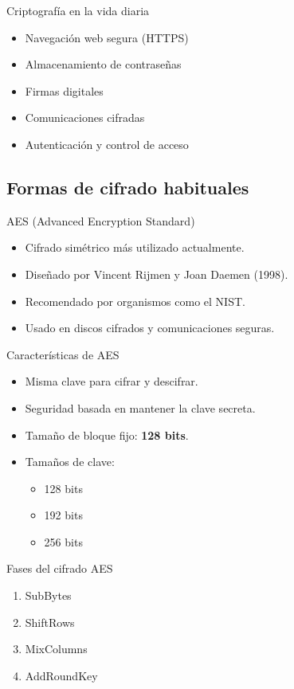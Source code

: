 \documentclass{beamer}
\begin{document}
\begin{frame}{Criptografía en la vida diaria}
\begin{itemize}
  \item Navegación web segura (HTTPS)
  \item Almacenamiento de contraseñas
  \item Firmas digitales
  \item Comunicaciones cifradas
  \item Autenticación y control de acceso
\end{itemize}
\end{frame}

\subsection{Formas de cifrado habituales}

\begin{frame}{AES (Advanced Encryption Standard)}
\begin{itemize}
  \item Cifrado simétrico más utilizado actualmente.
  \item Diseñado por Vincent Rijmen y Joan Daemen (1998).
  \item Recomendado por organismos como el NIST.
  \item Usado en discos cifrados y comunicaciones seguras.
\end{itemize}
\end{frame}

\begin{frame}{Características de AES}
\begin{itemize}
  \item Misma clave para cifrar y descifrar.
  \item Seguridad basada en mantener la clave secreta.
  \item Tamaño de bloque fijo: \textbf{128 bits}.
  \item Tamaños de clave:
  \begin{itemize}
    \item 128 bits
    \item 192 bits
    \item 256 bits
  \end{itemize}
\end{itemize}
\end{frame}

\begin{frame}{Fases del cifrado AES}
\begin{enumerate}
  \item SubBytes
  \item ShiftRows
  \item MixColumns
  \item AddRoundKey
\end{enumerate}
\end{frame}
\end{document}
